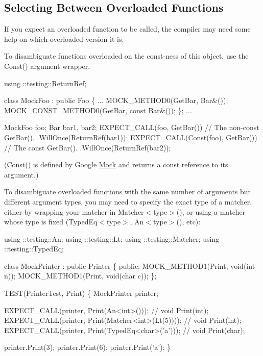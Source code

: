 \subsection*{Selecting Between Overloaded Functions}

If you expect an overloaded function to be called, the compiler may need some help on which overloaded version it is.

To disambiguate functions overloaded on the const-\/ness of this object, use the {\ttfamily Const()} argument wrapper.


\begin{DoxyCode}
using ::testing::ReturnRef;

\textcolor{keyword}{class }MockFoo : \textcolor{keyword}{public} Foo \{
  ...
  MOCK\_METHOD0(GetBar, Bar&());
  MOCK\_CONST\_METHOD0(GetBar, \textcolor{keyword}{const} Bar&());
\};
...

  MockFoo foo;
  Bar bar1, bar2;
  EXPECT\_CALL(foo, GetBar())         \textcolor{comment}{// The non-const GetBar().}
      .WillOnce(ReturnRef(bar1));
  EXPECT\_CALL(Const(foo), GetBar())  \textcolor{comment}{// The const GetBar().}
      .WillOnce(ReturnRef(bar2));
\end{DoxyCode}


({\ttfamily Const()} is defined by Google \hyperlink{classMock}{Mock} and returns a {\ttfamily const} reference to its argument.)

To disambiguate overloaded functions with the same number of arguments but different argument types, you may need to specify the exact type of a matcher, either by wrapping your matcher in {\ttfamily Matcher$<$type$>$()}, or using a matcher whose type is fixed ({\ttfamily Typed\+Eq$<$type$>$}, {\ttfamily An$<$type$>$()}, etc)\+:


\begin{DoxyCode}
using ::testing::An;
using ::testing::Lt;
using ::testing::Matcher;
using ::testing::TypedEq;

\textcolor{keyword}{class }MockPrinter : \textcolor{keyword}{public} Printer \{
 \textcolor{keyword}{public}:
  MOCK\_METHOD1(Print, \textcolor{keywordtype}{void}(\textcolor{keywordtype}{int} n));
  MOCK\_METHOD1(Print, \textcolor{keywordtype}{void}(\textcolor{keywordtype}{char} c));
\};

TEST(PrinterTest, Print) \{
  MockPrinter printer;

  EXPECT\_CALL(printer, Print(An<int>()));            \textcolor{comment}{// void Print(int);}
  EXPECT\_CALL(printer, Print(Matcher<int>(Lt(5))));  \textcolor{comment}{// void Print(int);}
  EXPECT\_CALL(printer, Print(TypedEq<char>(\textcolor{charliteral}{'a'})));   \textcolor{comment}{// void Print(char);}

  printer.Print(3);
  printer.Print(6);
  printer.Print(\textcolor{charliteral}{'a'});
\}
\end{DoxyCode}


